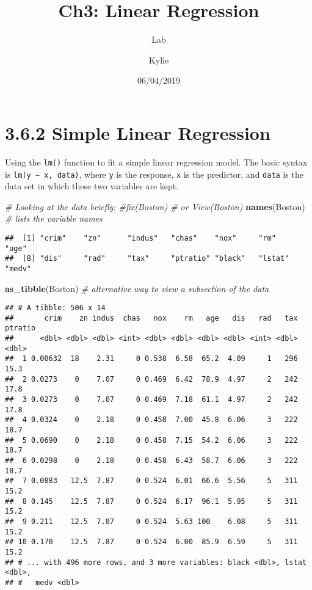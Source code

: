 \documentclass[]{article}
\title{Ch3: Linear Regression}
\subtitle{Lab}
\author{Kylie}
\date{06/04/2019}
\newenvironment{Shaded}{\begin{snugshade}}{\end{snugshade}}
\newcommand{\CommentTok}[1]{\textcolor[rgb]{0.56,0.35,0.01}{\textit{#1}}}
\newcommand{\KeywordTok}[1]{\textcolor[rgb]{0.13,0.29,0.53}{\textbf{#1}}}
\newcommand{\NormalTok}[1]{#1}
\begin{document}
\maketitle

\hypertarget{simple-linear-regression}{%
\section{3.6.2 Simple Linear
Regression}\label{simple-linear-regression}}

Using the \texttt{lm()} function to fit a simple linear regression
model. The basic syntax is \texttt{lm(y\ ∼\ x,\ data)}, where \texttt{y}
is the response, \texttt{x} is the predictor, and \texttt{data} is the
data set in which these two variables are kept.

\begin{Shaded}
\begin{Highlighting}[]
\CommentTok{# Looking at the data briefly:}
\CommentTok{#fix(Boston) # or View(Boston)}
\KeywordTok{names}\NormalTok{(Boston) }\CommentTok{# lists the variable names}
\end{Highlighting}
\end{Shaded}

\begin{verbatim}
##  [1] "crim"    "zn"      "indus"   "chas"    "nox"     "rm"      "age"    
##  [8] "dis"     "rad"     "tax"     "ptratio" "black"   "lstat"   "medv"
\end{verbatim}

\begin{Shaded}
\begin{Highlighting}[]
\KeywordTok{as_tibble}\NormalTok{(Boston) }\CommentTok{# alternative way to view a subsection of the data}
\end{Highlighting}
\end{Shaded}

\begin{verbatim}
## # A tibble: 506 x 14
##       crim    zn indus  chas   nox    rm   age   dis   rad   tax ptratio
##      <dbl> <dbl> <dbl> <int> <dbl> <dbl> <dbl> <dbl> <int> <dbl>   <dbl>
##  1 0.00632  18    2.31     0 0.538  6.58  65.2  4.09     1   296    15.3
##  2 0.0273    0    7.07     0 0.469  6.42  78.9  4.97     2   242    17.8
##  3 0.0273    0    7.07     0 0.469  7.18  61.1  4.97     2   242    17.8
##  4 0.0324    0    2.18     0 0.458  7.00  45.8  6.06     3   222    18.7
##  5 0.0690    0    2.18     0 0.458  7.15  54.2  6.06     3   222    18.7
##  6 0.0298    0    2.18     0 0.458  6.43  58.7  6.06     3   222    18.7
##  7 0.0883   12.5  7.87     0 0.524  6.01  66.6  5.56     5   311    15.2
##  8 0.145    12.5  7.87     0 0.524  6.17  96.1  5.95     5   311    15.2
##  9 0.211    12.5  7.87     0 0.524  5.63 100    6.08     5   311    15.2
## 10 0.170    12.5  7.87     0 0.524  6.00  85.9  6.59     5   311    15.2
## # ... with 496 more rows, and 3 more variables: black <dbl>, lstat <dbl>,
## #   medv <dbl>
\end{verbatim}
\end{document}
